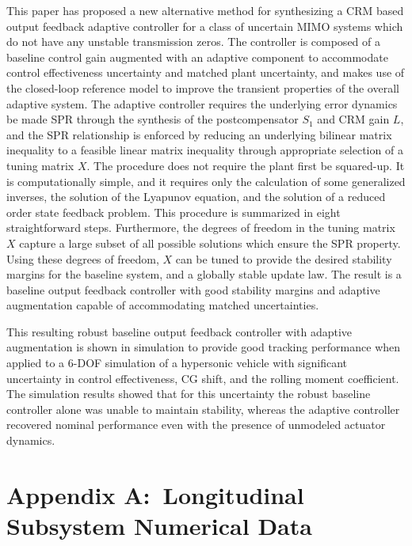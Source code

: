 \documentclass[]{../sty/JGCD}
\theoremstyle{examplestyle}
\begin{document}
  This paper has proposed a new alternative method for synthesizing a CRM based output feedback adaptive controller for a class of uncertain MIMO systems which do not have any unstable transmission zeros.
  The controller is composed of a baseline control gain augmented with an adaptive component to accommodate control effectiveness uncertainty and matched plant uncertainty, and makes use of the closed-loop reference model to improve the transient properties of the overall adaptive system.
  The adaptive controller requires the underlying error dynamics be made SPR through the synthesis of the postcompensator $S_{1}$ and CRM gain $L$, and the SPR relationship is enforced by reducing an underlying bilinear matrix inequality to a feasible linear matrix inequality through appropriate selection of a tuning matrix $X$.
  The procedure does not require the plant first be squared-up.
  It is computationally simple, and it requires only the calculation of some generalized inverses, the solution of the Lyapunov equation, and the solution of a reduced order state feedback problem.
  This procedure is summarized in eight straightforward steps.
  Furthermore, the degrees of freedom in the tuning matrix $X$ capture a large subset of all possible solutions which ensure the SPR property.
  Using these degrees of freedom, $X$ can be tuned to provide the desired stability margins for the baseline system, and a globally stable update law.
  The result is a baseline output feedback controller with good stability margins and adaptive augmentation capable of accommodating matched uncertainties.

  This resulting robust baseline output feedback controller with adaptive augmentation is shown in simulation to provide good tracking performance when applied to a 6-DOF simulation of a hypersonic vehicle with significant uncertainty in control effectiveness, CG shift, and the rolling moment coefficient.
  The simulation results showed that for this uncertainty the robust baseline controller alone was unable to maintain stability, whereas the adaptive controller recovered nominal performance even with the presence of unmodeled actuator dynamics.

  \section*{Appendix A:\ Longitudinal Subsystem Numerical Data}\label{sec.appendix_long}
\end{document}
